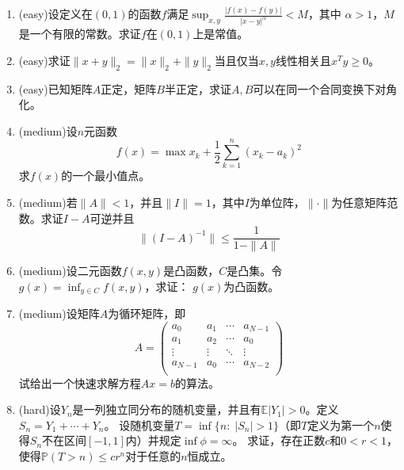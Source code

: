\documentclass[a4paper]{article}
\begin{document}
\begin{enumerate}
\item (easy)设定义在$(0,1)$的函数$f$满足$\sup_{x,y}\frac{|f(x)-f(y)|}{|x-y|^\alpha}<M$，其中
$\alpha>1$，$M$是一个有限的常数。求证$f$在$(0,1)$上是常值。
\item (easy)求证$\|x+y\|_2=\|x\|_2+\|y\|_2$当且仅当$x,y$线性相关且$x^Ty\geqslant 0$。
\item (easy)已知矩阵$A$正定，矩阵$B$半正定，求证$A,B$可以在同一个合同变换下对角化。
\item (medium)设$n$元函数
\[
f(x)=\max x_k + \frac{1}{2}\sum_{k=1}^{n}(x_k-a_k)^2
\]
求$f(x)$的一个最小值点。
\item (medium)若$\|A\|<1$，并且$\|I\|=1$，其中$I$为单位阵，$\|\cdot\|$为任意矩阵范数。求证$I-A$可逆并且
\begin{equation}
\|(I-A)^{-1}\|\leqslant \frac{1}{1-\|A\|}
\end{equation}
\item (medium)设二元函数$f(x,y)$是凸函数，$C$是凸集。令$g(x)=\inf_{y\in C}f(x,y)$，求证：
$g(x)$为凸函数。
\item (medium)设矩阵$A$为循环矩阵，即
\begin{equation}
A=\left(\begin{array}{cccc}
a_0 & a_1 & \cdots & a_{N-1} \\
a_1 & a_2 & \cdots & a_0     \\
\vdots & \vdots & \ddots & \vdots \\
a_{N-1} & a_0 & \cdots & a_{N-2} \\
\end{array}
\right)
\end{equation}
试给出一个快速求解方程$Ax=b$的算法。
\item (hard)设$Y_n$是一列独立同分布的随机变量，并且有$\mathbb{E}|Y_1|>0$。定义$S_n=Y_1+\cdots+Y_n$。
设随机变量$T=\inf\{n:\; |S_n|>1 \}$（即$T$定义为第一个$n$使得$S_n$不在区间$[-1,1]$内）并规定$\inf\phi=\infty$。
求证，存在正数$c$和$0<r<1$，使得$\mathbb{P}(T>n)\leqslant cr^n$对于任意的$n$恒成立。
\end{enumerate}
\end{document}
